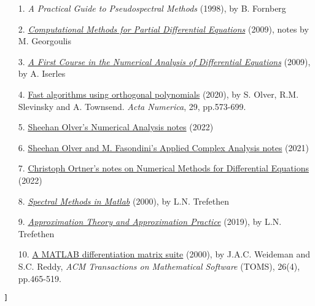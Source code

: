 \documentclass[12pt,a4paper]{article}
\begin{document}
\begin{itemize}
\item[1.  ] \emph{A Practical Guide to Pseudospectral Methods} (1998), by B. Fornberg


\item[2.  ] \href{http://users.math.uoc.gr/~tsogka/Courses/AEMDE-fall2015/Biblio/Georgoulis_notes_new.pdf}{\emph{Computational Methods for Partial Differential Equations}} (2009), notes by M. Georgoulis


\item[3.  ] \href{https://le.ac.uk/library}{\emph{A First Course in the Numerical Analysis of Differential Equations}} (2009), by A. Iserles 


\item[4.  ] \href{https://le.ac.uk/library}{Fast algorithms using orthogonal polynomials} (2020), by S. Olver, R.M. Slevinsky and A. Townsend. \emph{Acta Numerica}, 29, pp.573-699. 


\item[5.  ] \href{https://github.com/Imperial-MATH50003/MATH50003NumericalAnalysis2122}{Sheehan Olver's Numerical Analysis notes} (2022)


\item[6.  ] \href{https://github.com/MarcoFasondini/M3M6AppliedComplexAnalysis}{Sheehan Olver and M. Fasondini's Applied Complex Analysis notes} (2021)


\item[7.  ] \href{https://github.com/cortner/math405_2022}{Christoph Ortner's notes on Numerical Methods for Differential Equations} (2022)


\item[8.  ] \href{https://people.maths.ox.ac.uk/trefethen/spectral.html}{\emph{Spectral Methods in Matlab}} (2000), by L.N. Trefethen


\item[9.  ] \href{https://people.maths.ox.ac.uk/trefethen/ATAP/}{\emph{Approximation Theory and Approximation Practice}} (2019), by L.N. Trefethen


\item[10. ] \href{https://le.ac.uk/library}{A MATLAB differentiation matrix suite} (2000), by J.A.C.  Weideman and S.C. Reddy,  \emph{ACM Transactions on Mathematical Software} (TOMS), 26(4), pp.465-519.

\end{itemize}
\texttt{]}
\end{document}
